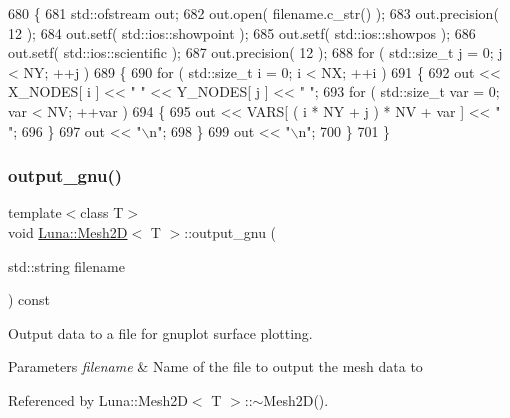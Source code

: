 \begin{DoxyCode}
680   \{
681     std::ofstream out;
682     out.open( filename.c\_str() );
683     out.precision( 12 );
684     out.setf( std::ios::showpoint );
685     out.setf( std::ios::showpos );
686     out.setf( std::ios::scientific );
687     out.precision( 12 );
688     \textcolor{keywordflow}{for} ( std::size\_t j = 0; j < NY; ++j )
689     \{
690       \textcolor{keywordflow}{for} ( std::size\_t i = 0; i < NX; ++i )
691       \{
692         out << X\_NODES[ i ] << \textcolor{stringliteral}{" "} << Y\_NODES[ j ] << \textcolor{stringliteral}{" "};
693         \textcolor{keywordflow}{for} ( std::size\_t var = 0; var < NV; ++var )
694         \{
695           out << VARS[ ( i * NY + j ) * NV + var ] << \textcolor{stringliteral}{" "};
696         \}
697         out << \textcolor{stringliteral}{"\(\backslash\)n"};
698       \}
699       out << \textcolor{stringliteral}{"\(\backslash\)n"};
700     \}
701   \}
\end{DoxyCode}
\mbox{\label{classLuna_1_1Mesh2D_a8fc9046e860764d5069c4e9b8667df1f}} 
\subsubsection{\texorpdfstring{output\+\_\+gnu()}{output\_gnu()}\hspace{0.1cm}{\footnotesize\ttfamily [1/3]}}
{\footnotesize\ttfamily template$<$class T$>$ \\
void \hyperlink{classLuna_1_1Mesh2D}{Luna\+::\+Mesh2D}$<$ T $>$\+::output\+\_\+gnu (\begin{DoxyParamCaption}\item[{std\+::string}]{filename }\end{DoxyParamCaption}) const}



Output data to a file for gnuplot surface plotting. 


\begin{DoxyParams}{Parameters}
{\em filename} & Name of the file to output the mesh data to \\
\hline
\end{DoxyParams}


Referenced by Luna\+::\+Mesh2\+D$<$ T $>$\+::$\sim$\+Mesh2\+D().

\mbox{\label{classLuna_1_1Mesh2D_ab5cffc3cb5b8424b11154cb35b98dbf3}} 
